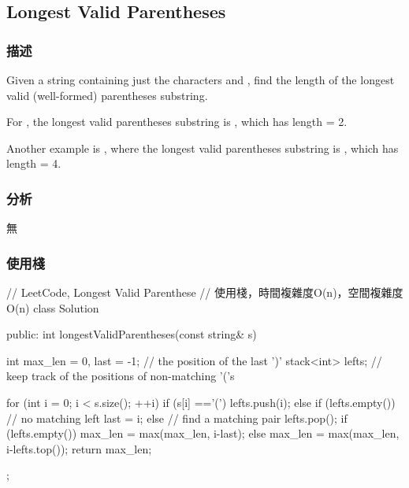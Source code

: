 \subsection{Longest Valid Parentheses} %
\label{sec:longest-valid-parentheses}


\subsubsection{描述}
Given a string containing just the characters  and , find the length of the longest valid (well-formed) parentheses substring.

For , the longest valid parentheses substring is , which has length = 2.

Another example is , where the longest valid parentheses substring is , which has length = 4.


\subsubsection{分析}
無


\subsubsection{使用棧}
\begin{Code}
// LeetCode, Longest Valid Parenthese
// 使用棧，時間複雜度O(n)，空間複雜度O(n)
class Solution {
public:
    int longestValidParentheses(const string& s) {
        int max_len = 0, last = -1; // the position of the last ')'
        stack<int> lefts;  // keep track of the positions of non-matching '('s

        for (int i = 0; i < s.size(); ++i) {
            if (s[i] =='(') {
                lefts.push(i);
            } else {
                if (lefts.empty()) {
                    // no matching left
                    last = i;
                } else {
                    // find a matching pair
                    lefts.pop();
                    if (lefts.empty()) {
                        max_len = max(max_len, i-last);
                    } else {
                        max_len = max(max_len, i-lefts.top());
                    }
                }
            }
        }
        return max_len;
    }
};
\end{Code}

